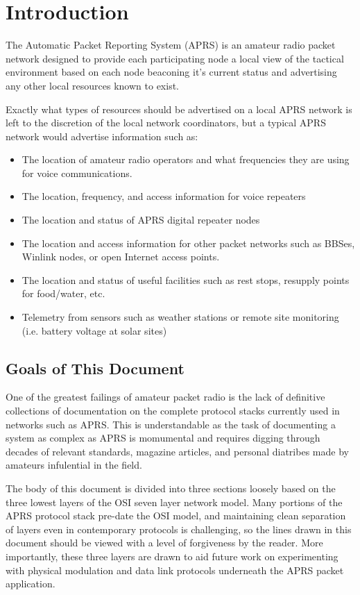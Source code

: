 

\chapter{Introduction}

The Automatic Packet Reporting System (APRS) is an amateur radio packet
network designed to provide each participating node a local view of the 
tactical environment based on each node beaconing it's current status
and advertising any other local resources known to exist.

Exactly what types of resources should be advertised on a local APRS
network is left to the discretion of the local network coordinators, but
a typical APRS network would advertise information such as:
\begin{itemize}
\item The location of amateur radio operators and what frequencies they are using for voice communications.
\item The location, frequency, and access information for voice repeaters
\item The location and status of APRS digital repeater nodes
\item The location and access information for other packet networks such as BBSes, Winlink nodes, or open Internet access points.
\item The location and status of useful facilities such as rest stops, resupply points for food/water, etc.
\item Telemetry from sensors such as weather stations or remote site monitoring (i.e. battery voltage at solar sites)
\end{itemize} 

\section{Goals of This Document}

One of the greatest failings of amateur packet radio is the lack of definitive
collections of documentation on the complete protocol stacks currently used in 
networks such as APRS. This is understandable as the task of documenting a 
system as complex as APRS is momumental and requires digging through decades of 
relevant standards, magazine articles, and personal diatribes made by amateurs
infulential in the field.

The body of this document is divided into three sections loosely based on the 
three lowest layers of the OSI seven layer network model. Many portions of the APRS
protocol stack
pre-date the OSI model, and maintaining clean separation of layers even in 
contemporary protocols is challenging, so the lines drawn in this document should
be viewed with a level of forgiveness by the reader. More importantly, these three
layers are drawn to aid future work on experimenting with physical modulation 
and data link protocols underneath the APRS packet application.

